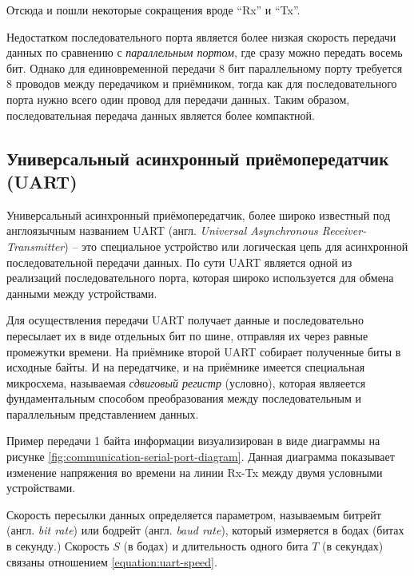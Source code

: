 \documentclass[../sparc.tex]{subfiles}
\begin{document}
Отсюда и пошли некоторые сокращения вроде ``Rx'' и
``Tx''.\autocite{so:krisw}

Недостатком последовательного порта является более низкая скорость передачи
данных по сравнению с \emph{параллельным портом}, где сразу можно передать
восемь бит.  Однако для единовременной передачи 8 бит параллельному порту
требуется 8 проводов между передачиком и приёмником, тогда как для
последовательного порта нужно всего один провод для передачи данных.  Таким
образом, последовательная передача данных является более компактной.

\subsection{Универсальный асинхронный приёмопередатчик (UART)}
\label{section:communication-uart}

Универсальный асинхронный приёмопередатчик, более широко известный под
англоязычным названием \gls{UART} (англ. \emph{Universal Asynchronous
Receiver-Transmitter}) -- это специальное устройство или логическая цепь для
асинхронной последовательной передачи данных.  По сути UART является одной из
реализаций последовательного порта, которая широко используется для обмена
данными между устройствами.

Для осуществления передачи UART получает данные и последовательно пересылает их
в виде отдельных бит по шине, отправляя их через равные промежутки времени.  На
приёмнике второй UART собирает полученные биты в исходные байты.  И на
передатчике, и на приёмнике имеется специальная микросхема, называемая
\emph{сдвиговый регистр} (условно), которая являеется фундаментальным способом
преобразования между последовательным и параллельным представлением данных.


Пример передачи 1 байта информации визуализирован в виде диаграммы на рисунке
\ref{fig:communication-serial-port-diagram}.  Данная диаграмма показывает
изменение напряжения во времени на линии Rx-Tx между двумя условными
устройствами.


Скорость пересылки данных определяется параметром, называемым битрейт
(англ. \emph{bit rate}) или бодрейт (англ. \emph{baud rate}), который измеряется
в бодах (битах в секунду.)  Скорость $S$ (в бодах) и длительность одного бита
$T$ (в секундах) связаны отношением \ref{equation:uart-speed}.
\end{document}
